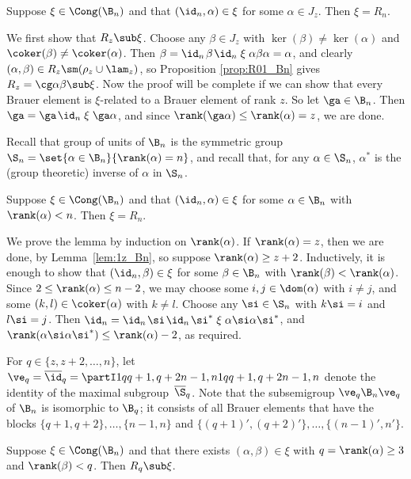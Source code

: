 \begin{lemma}\label{lem:1z_Bn}
Suppose $\xi\in\Cong(\B_n)$ and that $(\id_n,\alpha)\in\xi$ for some $\alpha\in J_z$.  Then $\xi=R_n$.
\end{lemma}

\pf 
We first show that $R_z\sub\xi$.  
Choose any $\beta\in J_z$ with $\ker(\beta)\not=\ker(\alpha)$ and $\coker(\beta)\not=\coker(\alpha)$.  
Then $\beta=\id_n\;\!\beta\;\!\id_n\mathrel\xi\alpha\beta\alpha=\alpha$,
and clearly $(\alpha,\beta)\in R_z\sm(\rho_z\cup\lam_z)$, so Proposition \ref{prop:R01_Bn} gives $R_z=\cg\alpha\beta\sub\xi$.  
Now 
the proof will be complete if we can show that every Brauer element is $\xi$-related to a Brauer element of rank $z$.  So let $\ga\in\B_n$.  Then $\ga=\ga\;\!\id_n\mathrel\xi\ga\alpha$, and since $\rank(\ga\alpha)\leq\rank(\alpha)=z$, we are done. \epf

Recall that group of units of $\B_n$ is the symmetric group $\S_n=\set{\alpha\in\B_n}{\rank(\alpha)=n}$, and recall  that, for any $\alpha\in\S_n$, $\alpha^*$ is the (group theoretic) inverse of $\alpha$ in $\S_n$.


\begin{lemma}\label{lem:1q_Bn}
Suppose $\xi\in\Cong(\B_n)$ and that $(\id_n,\alpha)\in\xi$ for some $\alpha\in\B_n$ with $\rank(\alpha)<n$.  Then $\xi=R_n$.
\end{lemma}

\pf We prove the lemma by induction on $\rank(\alpha)$.  If $\rank(\alpha)=z$, then
we are done, by Lemma~\ref{lem:1z_Bn}, so suppose $\rank(\alpha)\geq z+2$.  Inductively, it is enough to show that $(\id_n,\beta)\in\xi$ for some $\beta\in\B_n$ with ${\rank(\beta)<\rank(\alpha)}$.  Since $2\leq\rank(\alpha)\leq n-2$, we may choose some $i,j\in\dom(\alpha)$ with $i\not=j$, and some $(k,l)\in\coker(\alpha)$ with $k\not=l$.  Choose any $\si\in\S_n$ with $k\si=i$ and $l\si=j$.  Then $\id_n = \id_n\;\!\si\;\!\id_n\;\!\si^* \mathrel\xi \alpha\si\alpha\si^*$, and $\rank(\alpha\si\alpha\si^*)\leq\rank(\alpha)-2$, as required. \epf

For $q\in\{z,z+2,\dots,n\}$, let $\ve_q=\overline\id_q=\partI1q{q+1,q+2}{n-1,n}1q{q+1,q+2}{n-1,n}$
denote the identity of the maximal subgroup~$\overline{\S}_q$.  
Note that the subsemigroup $\ve_q\B_n\ve_q$ of $\B_n$ is isomorphic to $\B_q$; it consists of all Brauer elements that have the blocks $\{q+1,q+2\},\ldots,\{n-1,n\}$ and $\{(q+1)',(q+2)'\},\ldots,\{(n-1)',n'\}$.



\begin{lemma}\label{lem:qp_Bn}
Suppose $\xi\in\Cong(\B_n)$ and that there exists $(\alpha,\beta)\in\xi$ with $q=\rank(\alpha)\geq3$ and $\rank(\beta)<q$.  Then $R_q\sub\xi$.
\end{lemma}

